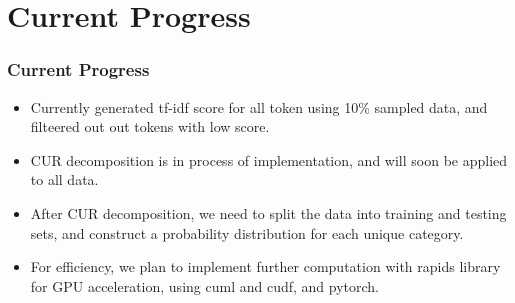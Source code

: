 \documentclass[
    10pt %
    16:9, %
]{beamer}
\begin{document}
\section{Current Progress}
\begin{frame}
  \frametitle{Current Progress}
  \begin{itemize}
    \item Currently generated tf-idf score for all token using 10\% sampled data, and filteered out out tokens with low score.
    \item CUR decomposition is in process of implementation, and will soon be applied to all data.
    \item After CUR decomposition, we need to split the data into training and testing sets, and construct a probability distribution for each unique category.
    \item For efficiency, we plan to implement further computation with rapids library for GPU acceleration, using cuml and cudf, and pytorch.
  \end{itemize}
\end{frame}
\end{document}
